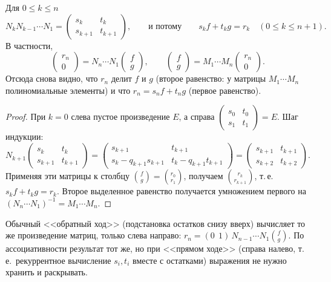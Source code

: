 \begin{proposition}[1.8a]
Для $0\le k\le n$
\[
N_kN_{k-1}\cdots N_1=\begin{pmatrix}s_k&t_k\\ s_{k+1}&t_{k+1}\end{pmatrix},\qquad\text{и потому}\qquad
s_kf+t_kg=r_k\quad(0\le k\le n+1).
\]
В частности,
\[
\begin{pmatrix}r_n\\0\end{pmatrix}=N_n\cdots N_1\begin{pmatrix}f\\ g\end{pmatrix},\qquad
\begin{pmatrix}f\\ g\end{pmatrix}=M_1\cdots M_n\begin{pmatrix}r_n\\0\end{pmatrix}.
\]
Отсюда снова видно, что $r_n$ делит $f$ и $g$ (второе равенство: у матрицы $M_1\cdots M_n$ полиномиальные элементы) и
что $r_n=s_nf+t_ng$ (первое равенство).
\end{proposition}

\begin{proof}
При $k=0$ слева пустое произведение $E$, а справа $\left(\begin{smallmatrix}s_0&t_0\\s_1&t_1\end{smallmatrix}\right)=E$.
Шаг индукции:
\[
N_{k+1}\begin{pmatrix}s_k&t_k\\ s_{k+1}&t_{k+1}\end{pmatrix}
=\begin{pmatrix}s_{k+1}&t_{k+1}\\ s_k-q_{k+1}s_{k+1}&t_k-q_{k+1}t_{k+1}\end{pmatrix}
=\begin{pmatrix}s_{k+1}&t_{k+1}\\ s_{k+2}&t_{k+2}\end{pmatrix}.
\]
Применяя эти матрицы к столбцу $\binom fg=\binom{r_0}{r_1}$, получаем $\binom{r_k}{r_{k+1}}$, т.\,е.\ $s_kf+t_kg=r_k$. Второе
выделенное равенство получается умножением первого на $(N_n\cdots N_1)^{-1}=M_1\cdots M_n$.
\end{proof}

Обычный <<обратный ход>> (подстановка остатков снизу вверх) вычисляет то же произведение матриц, только слева направо:
$r_n=(0\ \ 1)\,N_{n-1}\cdots N_1\binom fg$. По ассоциативности результат тот же, но при <<прямом ходе>> (справа
налево, т.\,е.\ рекуррентное вычисление $s_i,t_i$ вместе с остатками) выражения не нужно хранить и раскрывать.

